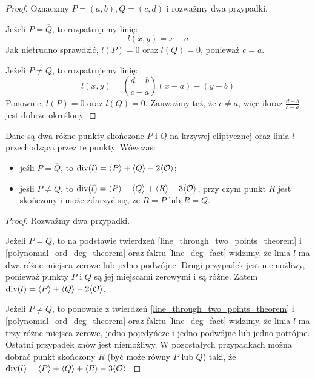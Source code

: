 \begin{proof}
Oznaczmy $P = (a, b), Q = (c, d)$ i rozważmy dwa przypadki.

Jeżeli $P = \overline{Q}$,
to rozpatrujemy linię:
\begin{equation}
l(x, y) = x - a
\end{equation}
Jak nietrudno sprawdzić, $l(P) = 0$ oraz $l(Q) = 0$,
ponieważ $c = a$.

Jeżeli $P \neq \overline{Q}$,
to rozpatrujemy linię:
\begin{equation}
l(x, y) = \left(\frac{d-b}{c-a}\right)(x - a) - (y - b)
\end{equation}
Ponownie, $l(P) = 0$ oraz $l(Q) = 0$.
Zauważmy też, że $c \neq a$,
więc iloraz $\frac{d-b}{c-a}$ jest dobrze określony.
\end{proof}

\begin{theorem}
Dane są dwa różne punkty skończone $P$ i $Q$ na krzywej eliptycznej
oraz linia $l$ przechodząca przez te punkty.
Wówczas:
\begin{itemize}
\item jeśli $P = \overline{Q}$,
to $\operatorname{div}(l) = \langle P\rangle + \langle Q\rangle - 2\langle\mathcal{O}\rangle$;
\item jeśli $P \neq \overline{Q}$,
to $\operatorname{div}(l) = \langle P\rangle + \langle Q\rangle + \langle R\rangle - 3\langle\mathcal{O}\rangle$,
przy czym punkt $R$ jest skończony
i może zdarzyć się, że $R = P$ lub $R = Q$.
\end{itemize}
\end{theorem}

\begin{proof}
Rozważmy dwa przypadki.

Jeżeli $P = \overline{Q}$,
to na podstawie twierdzeń
\ref{line_through_two_points_theorem} i \ref{polynomial_ord_deg_theorem}
oraz faktu \ref{line_deg_fact} widzimy,
że linia $l$ ma dwa różne miejsca zerowe lub jedno podwójne.
Drugi przypadek jest niemożliwy,
ponieważ punkty $P$ i $Q$ są jej miejscami zerowymi i są różne.
Zatem $\operatorname{div}(l) = \langle P\rangle + \langle Q\rangle - 2\langle\mathcal{O}\rangle$.

Jeżeli $P \neq \overline{Q}$,
to ponownie z twierdzeń
\ref{line_through_two_points_theorem} i \ref{polynomial_ord_deg_theorem}
oraz faktu \ref{line_deg_fact} widzimy,
że linia $l$ ma trzy różne miejsca zerowe, jedno pojedyńcze i jedno podwójne
lub jedno potrójne.
Ostatni przypadek znów jest niemożliwy.
W pozostałych przypadkach można dobrać punkt skończony $R$
(być może równy $P$ lub $Q$) taki,
że $\operatorname{div}(l) = \langle P\rangle + \langle Q\rangle + \langle R\rangle - 3\langle\mathcal{O}\rangle$.
\end{proof}

